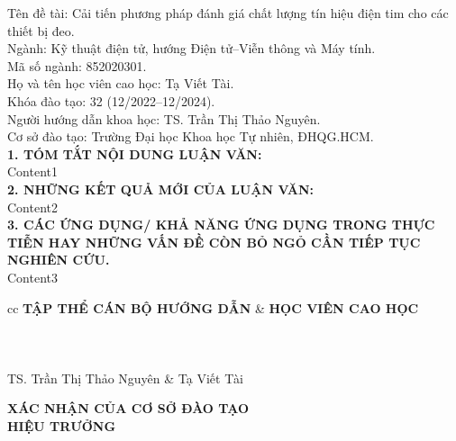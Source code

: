 \begin{flushleft}
	Tên đề tài: Cải tiến phương pháp đánh giá chất lượng tín hiệu điện tim cho các thiết bị đeo. \\
	Ngành: Kỹ thuật điện tử, hướng Điện tử--Viễn thông và Máy tính. \\
	Mã số ngành: 852020301. \\
	Họ và tên học viên cao học: Tạ Viết Tài. \\
	Khóa đào tạo: 32 (12/2022--12/2024). \\
	Người hướng dẫn khoa học: TS. Trần Thị Thảo Nguyên.\\
	Cơ sở đào tạo: Trường Đại học Khoa học Tự nhiên, ĐHQG.HCM. \\
	\vspace{1.5em}
	\textbf{1. TÓM TẮT NỘI DUNG LUẬN VĂN:}\\
	Content1 \\
	\textbf{2. NHỮNG KẾT QUẢ MỚI CỦA LUẬN VĂN:}\\
	Content2 \\
	\textbf{3. CÁC ỨNG DỤNG/ KHẢ NĂNG ỨNG DỤNG TRONG THỰC TIỄN HAY NHỮNG VẤN ĐỀ CÒN BỎ NGỎ CẦN TIẾP TỤC NGHIÊN CỨU.}\\
	Content3 \\
\end{flushleft}


\vspace{1.5em}
\begin{tblr}{cc}
    \centering
    \textbf{TẬP THỂ CÁN BỘ HƯỚNG DẪN} & \textbf{\hspace{5.0em}HỌC VIÊN CAO HỌC} \\
    \\
    \\
    \\
    TS. Trần Thị Thảo Nguyên & \hspace{5.0em} Tạ Viết Tài
\end{tblr}

\vspace{2.5em}
\begin{center}
    \textbf{XÁC NHẬN CỦA CƠ SỞ ĐÀO TẠO} \\
    \textbf{HIỆU TRƯỞNG}
\end{center}